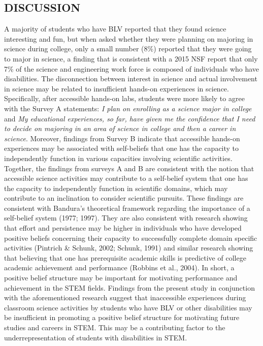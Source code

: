 \documentclass[11.5pt]{sig-alternate} %
\begin{document}
\begin{large}
\section*{DISCUSSION}

A majority of students who have BLV reported that they found science interesting and fun, but when asked whether they were planning on majoring in science during college, only a small number (8\%) reported that they were going to major in science, a finding that is consistent with a 2015 NSF report that only 7\% of the science and engineering work force is composed of individuals who have disabilities. The disconnection between interest in science and actual involvement in science may be related to insufficient hands-on experiences in science. Specifically, after accessible hands-on labs, students were more likely to agree with the Survey A statements: \textit{I plan on enrolling as a science major in college} and \textit{My educational experiences, so far, have given me the confidence that I need to decide on majoring in an area of science in college and then a career in science}. Moreover, findings from Survey B indicate that accessible hands-on experiences may be associated with self-beliefs that one has the capacity to independently function in various capacities involving scientific activities. Together, the findings from surveys A and B are consistent with the notion that accessible science activities may contribute to a self-belief system that one has the capacity to independently function in scientific domains, which may contribute to an inclination to consider scientific pursuits. These findings are consistent with Bandura's theoretical framework regarding the importance of a self-belief system (1977; 1997). They are also consistent with research showing that effort and persistence may be higher in individuals who have developed positive beliefs concerning their capacity to successfully complete domain specific activities (Pintrich \& Schunk, 2002; Schunk, 1991) and similar research showing that believing that one has prerequisite academic skills is predictive of college academic achievement and performance (Robbins et al., 2004). In short, a positive belief structure may be important for motivating performance and achievement in the STEM fields. Findings from the present study in conjunction with the aforementioned research suggest that inaccessible experiences during classroom science activities by students who have BLV or other disabilities may be insufficient in promoting a positive belief structure for motivating future studies and careers in STEM. This may be a contributing factor to the underrepresentation of students with disabilities in STEM.


\end{large}
\end{document}
